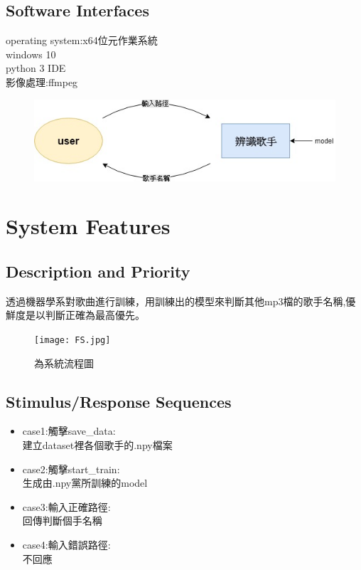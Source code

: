 \documentclass{article}
\begin{document}
\begin{CJK}{UTF8}{bkai}
\subsection{\Large Software Interfaces\\}
operating system:x64位元作業系統 \\
 windows 10\\
python 3 IDE \\
影像處理:ffmpeg\\
\begin{figure}[h]
\begin{center}
\includegraphics[width=13cm]{software_interface.jpg}
\end{center}
\label{fig:1}
\end{figure}
\newpage



\section{\huge\bf \color{blue}  System Features }
\subsection{\Large Description and Priority }
	
	透過機器學系對歌曲進行訓練，用訓練出的模型來判斷其他mp3檔的歌手名稱,優鮮度是以判斷正確為最高優先。
\begin{figure}[h]
\begin{center}
\texttt{[image: FS.jpg]}
\end{center}
\caption{為系統流程圖}
\label{fig:2}
\end{figure}

\subsection{\Large Stimulus/Response Sequences}
	\begin{itemize}
		\item case1:觸擊save\_data:\\
			建立dataset裡各個歌手的.npy檔案
		\item case2:觸擊start\_train:\\
			生成由.npy黨所訓練的model
		\item case3:輸入正確路徑:\\
			回傳判斷個手名稱
		\item case4:輸入錯誤路徑:\\
			不回應
	\end{itemize} 

\end{CJK}
\end{document}
